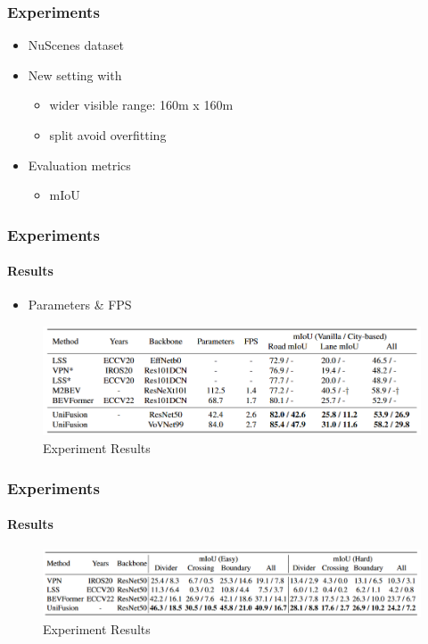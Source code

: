 \documentclass[
	12pt, %
	aspectratio=169, %
]{beamer}
\begin{document}
\begin{frame}
	\frametitle{Experiments}

	\begin{itemize}
		\item NuScenes dataset
		\item New setting with
		\begin{itemize}
			\item wider visible range: 160m x 160m
			\item split avoid overfitting
		\end{itemize}
		\item Evaluation metrics
		\begin{itemize}
			\item mIoU
		\end{itemize}
	\end{itemize}
\end{frame}

\begin{frame}
	\frametitle{Experiments}
	\framesubtitle{Results}

	\begin{itemize}
		\item Parameters \& FPS
	\end{itemize}
	\begin{figure}
		\centering
		\includegraphics[width=0.9\linewidth]{"./Images/experiment_result_100_100.png"}
		\caption{Experiment Results}
	\end{figure}
\end{frame}

\begin{frame}
	\frametitle{Experiments}
	\framesubtitle{Results}

	\begin{figure}
		\centering
		\includegraphics[width=\linewidth]{"./Images/experiment_result_160_100.png"}
		\caption{Experiment Results}
	\end{figure}
\end{frame}
\end{document}
